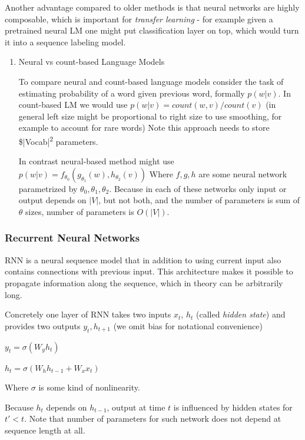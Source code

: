 \documentclass[longabstract,mgr,english]{iithesis}
\begin{document}
Another advantage compared to older methods is that neural networks are highly composable,
which is important for \emph{transfer learning} - for example given a pretrained neural LM one might put classification layer on top,
which would turn it into a sequence labeling model.

\begin{enumerate}
\item Neural vs count-based Language Models


To compare neural and count-based language models consider the task of estimating probability of a word given previous word, formally \(p(w|v)\).
In count-based LM we would use \(p(w|v) = count(w,v)/count(v)\) (in general left size might be proportional to right size to use smoothing, for example to account for rare words)
Note this approach needs to store \$|Vocab|\textsuperscript{2} parameters.

In contrast neural-based method might use \(p(w|v) = f_{\theta_0}(g_{\theta_1}(w), h_{\theta_2}(v))\)
Where \(f, g, h\) are some neural network parametrized by \(\theta_0, \theta_1, \theta_2\).
Because in each of these networks only input or output depends on \(|V|\), but not both, and the number of parameters is sum of \(\theta\) sizes, number of parameters is \(O(|V|)\).
\end{enumerate}

\subsubsection{Recurrent Neural Networks}


RNN is a neural sequence model that in addition to using current input also contains connections with previous input.
This architecture makes it possible to propagate information along the sequence, which in theory can be arbitrarily long.

Concretely one layer of RNN takes two inputs \(x_t\), \(h_t\) (called \emph{hidden state}) and provides two outputs \(y_t, h_{t+1}\) (we omit bias for notational convenience)

\(y_t = \sigma(W_y h_t)\)

\(h_t = \sigma(W_h h_{t-1} + W_x x_t)\)

Where \(\sigma\) is some kind of nonlinearity.

Because \(h_t\) depends on \(h_{t-1}\), output at time \(t\) is influenced by hidden states for \(t' < t\).
Note that number of parameters for such network does not depend at sequence length at all.
\end{document}
